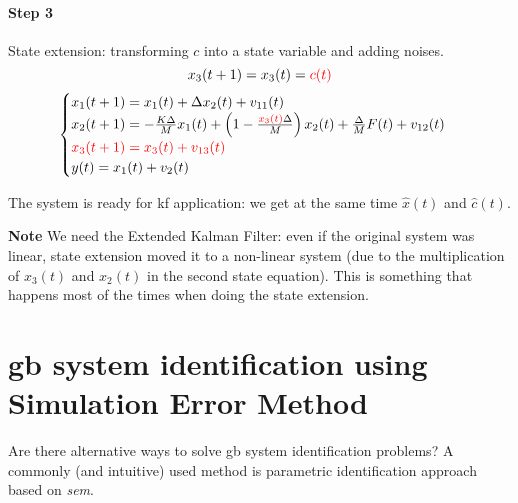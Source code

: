 \begin{example}
    \paragraph{Step 3} State extension: transforming $c$ into a state variable and adding noises.
    \[
        x_3(t+1) = x_3(t) = {\color{red}c(t)}
    \]
    \[
        \begin{cases}
            x_1(t+1) = x_1(t) + \Delta x_2(t) + v_{11}(t) \\
            x_2(t+1) = -\frac{K\Delta}{M}x_1(t) + \left(1-\frac{{\color{red}x_3(t)} \Delta }{M}\right)x_2(t) + \frac{\Delta}{M}F(t) + v_{12}(t) \\
            {\color{red}x_3(t+1) = x_3(t) + v_{13}(t)} \\
            y(t) = x_1(t) + v_2(t)
        \end{cases}
    \]

    The system is ready for \gls{kf} application: we get at the same time $\hat{x}(t)$ and $\hat{c}(t)$.

    \textbf{Note} We need the Extended Kalman Filter: even if the original system was linear, state extension moved it to a non-linear system (due to the multiplication of $x_3(t)$ and $x_2(t)$ in the second state equation). This is something that happens most of the times when doing the state extension.
\end{example}


\section{\gls{gb} system identification using Simulation Error Method}

Are there alternative ways to solve \acrlong{gb} system identification problems?
A commonly (and intuitive) used method is parametric identification approach based on \emph{\gls{sem}}.

\begin{figure}[H]
    \centering
\end{figure}

